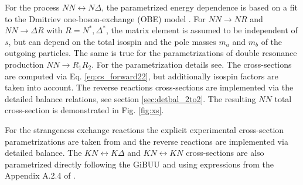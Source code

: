For the process $NN\leftrightarrow N\Delta$, the parametrized energy dependence
is based on a fit to the Dmitriev one-boson-exchange (OBE) model
\cite{Dmitriev:1986st}. For $NN\rightarrow NR$ and $NN\rightarrow \Delta R$
with $R=N^*,\Delta^*$, the matrix element is assumed to be independent of
$s$, but can depend on the total isospin and the pole masses $m_a$ and $m_b$ of
the outgoing particles. The same is true for the parametrizations of double resonance
production $NN \to R_1 R_2$. For the parametrization details see\cite{Weil:2016zrk}.
The cross-sections are computed via Eq. \ref{eq:cs_forward22}, but additionally
isospin factors are taken into account. The reverse reactions cross-sections are
implemented via the detailed balance relations, see section \ref{sec:detbal_2to2}.
The resulting $NN$ total cross-section is demonstrated in Fig. \ref{fig:xs}.

For the strangeness exchange reactions the explicit experimental cross-section
parametrizations are taken from \cite{Graef:2014mra} and the reverse reactions
are implemented via detailed balance. The $KN \leftrightarrow K\Delta$ and
$KN \leftrightarrow KN$ cross-sections are also parametrized directly following
the GiBUU and using expressions from the Appendix A.2.4 of \cite{thesis_Effenberger}.

